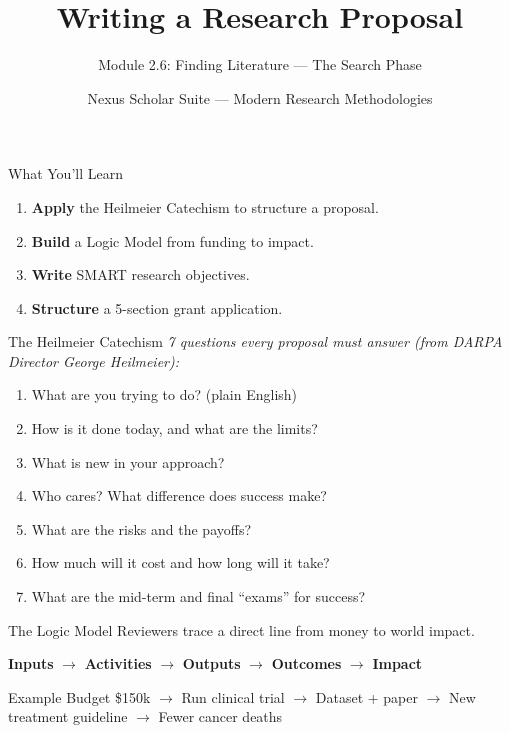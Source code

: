 \documentclass[aspectratio=169]{beamer}
\title{Writing a Research Proposal}
\subtitle{Module 2.6: Finding Literature — The Search Phase}
\author{Nexus Scholar Suite --- Modern Research Methodologies}
\date{}
\begin{document}
\begin{frame}[plain]
  \titlepage
\end{frame}

\begin{frame}{What You'll Learn}
  \begin{enumerate}
    \item \textbf{Apply} the Heilmeier Catechism to structure a proposal.
    \item \textbf{Build} a Logic Model from funding to impact.
    \item \textbf{Write} SMART research objectives.
    \item \textbf{Structure} a 5-section grant application.
  \end{enumerate}
\end{frame}

\begin{frame}{The Heilmeier Catechism}
  \textit{7 questions every proposal must answer (from DARPA Director George Heilmeier):}
  \vspace{0.3cm}
  \begin{enumerate}
    \item What are you trying to do? (plain English)
    \item How is it done today, and what are the limits?
    \item What is new in your approach?
    \item Who cares? What difference does success make?
    \item What are the risks and the payoffs?
    \item How much will it cost and how long will it take?
    \item What are the mid-term and final ``exams'' for success?
  \end{enumerate}
\end{frame}

\begin{frame}{The Logic Model}
  Reviewers trace a direct line from money to world impact.
  \vspace{0.5cm}
  \begin{center}
  \textbf{Inputs} $\rightarrow$ \textbf{Activities} $\rightarrow$ \textbf{Outputs} $\rightarrow$ \textbf{Outcomes} $\rightarrow$ \textbf{Impact}
  \end{center}
  \vspace{0.3cm}
  \begin{exampleblock}{Example}
    Budget \$150k $\rightarrow$ Run clinical trial $\rightarrow$ Dataset + paper $\rightarrow$ New treatment guideline $\rightarrow$ Fewer cancer deaths
  \end{exampleblock}
\end{frame}
\end{document}
